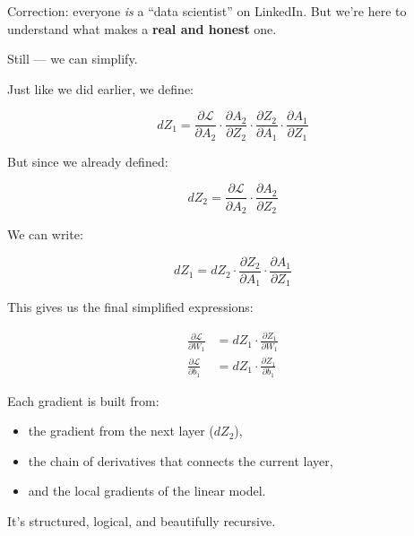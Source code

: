 \documentclass[11pt]{article}
\begin{document}
\begin{tcolorbox}[colback=blue!5, colframe=blue!80!black, title=Side Note]
Correction: everyone \emph{is} a “data scientist” on LinkedIn.  
But we’re here to understand what makes a \textbf{real and honest} one.
\end{tcolorbox}

\vspace{1em}

Still — we can simplify.

Just like we did earlier, we define:

\[
dZ_1 = 
\frac{\partial \mathcal{L}}{\partial A_2} \cdot 
\frac{\partial A_2}{\partial Z_2} \cdot 
\frac{\partial Z_2}{\partial A_1} \cdot 
\frac{\partial A_1}{\partial Z_1}
\]

But since we already defined:

\[
dZ_2 = \frac{\partial \mathcal{L}}{\partial A_2} \cdot \frac{\partial A_2}{\partial Z_2}
\]

We can write:

\[
dZ_1 = dZ_2 \cdot \frac{\partial Z_2}{\partial A_1} \cdot \frac{\partial A_1}{\partial Z_1}
\]

This gives us the final simplified expressions:

\[
\begin{aligned}
\frac{\partial \mathcal{L}}{\partial W_1} &= dZ_1 \cdot \frac{\partial Z_1}{\partial W_1} \\
\frac{\partial \mathcal{L}}{\partial b_1} &= dZ_1 \cdot \frac{\partial Z_1}{\partial b_1}
\end{aligned}
\]

\begin{tcolorbox}[colback=green!5!white, colframe=green!60!black, title=Structure of the Backward Pass]
Each gradient is built from:
\begin{itemize}
    \item the gradient from the next layer ($dZ_2$),
    \item the chain of derivatives that connects the current layer,
    \item and the local gradients of the linear model.
\end{itemize}
It’s structured, logical, and beautifully recursive.
\end{tcolorbox}


\section*{}
\end{document}
